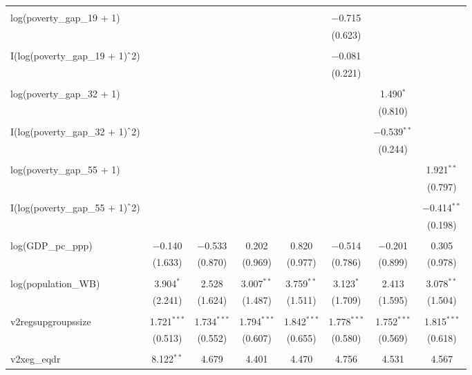 \documentclass[a4paper, 12pt]{article}
\begin{document}
\begin{table}[!htbp]
{\begin{tabular}{@{\extracolsep{5pt}}lccccccc}
  & & & & & & & \\ 
 log(poverty\_gap\_19 + 1) &  &  &  &  & $-$0.715 &  &  \\ 
  &  &  &  &  & (0.623) &  &  \\ 
  & & & & & & & \\ 
 I(log(poverty\_gap\_19 + 1)$\hat{\mkern6mu}$2) &  &  &  &  & $-$0.081 &  &  \\ 
  &  &  &  &  & (0.221) &  &  \\ 
  & & & & & & & \\ 
 log(poverty\_gap\_32 + 1) &  &  &  &  &  & 1.490$^{*}$ &  \\ 
  &  &  &  &  &  & (0.810) &  \\ 
  & & & & & & & \\ 
 I(log(poverty\_gap\_32 + 1)$\hat{\mkern6mu}$2) &  &  &  &  &  & $-$0.539$^{**}$ &  \\ 
  &  &  &  &  &  & (0.244) &  \\ 
  & & & & & & & \\ 
 log(poverty\_gap\_55 + 1) &  &  &  &  &  &  & 1.921$^{**}$ \\ 
  &  &  &  &  &  &  & (0.797) \\ 
  & & & & & & & \\ 
 I(log(poverty\_gap\_55 + 1)$\hat{\mkern6mu}$2) &  &  &  &  &  &  & $-$0.414$^{**}$ \\ 
  &  &  &  &  &  &  & (0.198) \\ 
  & & & & & & & \\ 
 log(GDP\_pc\_ppp) & $-$0.140 & $-$0.533 & 0.202 & 0.820 & $-$0.514 & $-$0.201 & 0.305 \\ 
  & (1.633) & (0.870) & (0.969) & (0.977) & (0.786) & (0.899) & (0.978) \\ 
  & & & & & & & \\ 
 log(population\_WB) & 3.904$^{*}$ & 2.528 & 3.007$^{**}$ & 3.759$^{**}$ & 3.123$^{*}$ & 2.413 & 3.078$^{**}$ \\ 
  & (2.241) & (1.624) & (1.487) & (1.511) & (1.709) & (1.595) & (1.504) \\ 
  & & & & & & & \\ 
 v2regsupgroupssize & 1.721$^{***}$ & 1.734$^{***}$ & 1.794$^{***}$ & 1.842$^{***}$ & 1.778$^{***}$ & 1.752$^{***}$ & 1.815$^{***}$ \\ 
  & (0.513) & (0.552) & (0.607) & (0.655) & (0.580) & (0.569) & (0.618) \\ 
  & & & & & & & \\ 
 v2xeg\_eqdr & 8.122$^{**}$ & 4.679 & 4.401 & 4.470 & 4.756 & 4.531 & 4.567 \\ 

\end{tabular}}
\end{table}
\end{document}
